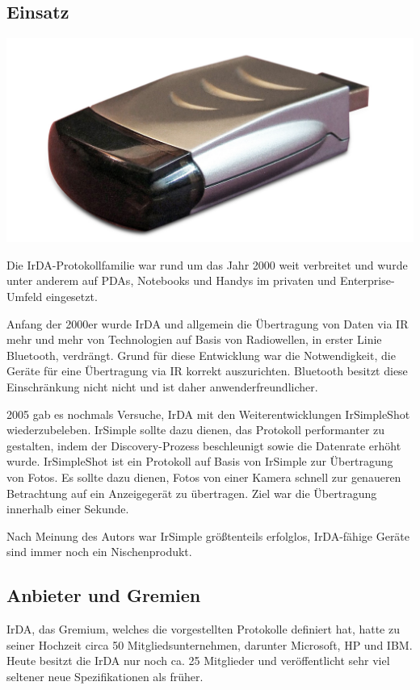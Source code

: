 \begin{multicols}{3}

\subsection*{Einsatz}
\begin{Figure}
\includegraphics[width=\linewidth]{Kapitel/IrDA/Grafiken/irda_usb.jpg}
\label{fig:irda.modem}
\end{Figure}
Die IrDA-Protokollfamilie war rund um das Jahr 2000 weit verbreitet und wurde unter anderem auf PDAs, Notebooks und Handys im privaten und Enterprise-Umfeld eingesetzt.

Anfang der 2000er wurde IrDA und allgemein die Übertragung von Daten via IR mehr und mehr von Technologien auf Basis von Radiowellen, in erster Linie Bluetooth, verdrängt. Grund für diese Entwicklung war die Notwendigkeit, die Geräte für eine Übertragung via IR korrekt auszurichten. Bluetooth besitzt diese Einschränkung nicht nicht und ist daher anwenderfreundlicher. 

2005 gab es nochmals Versuche, IrDA mit den Weiterentwicklungen IrSimpleShot wiederzubeleben. IrSimple sollte dazu dienen, das Protokoll performanter zu gestalten, indem der Discovery-Prozess beschleunigt sowie die Datenrate erhöht wurde. IrSimpleShot ist ein Protokoll auf Basis von IrSimple zur Übertragung von Fotos. Es sollte dazu dienen, Fotos von einer Kamera schnell zur genaueren Betrachtung auf ein Anzeigegerät zu übertragen. Ziel war die Übertragung innerhalb einer Sekunde.

Nach Meinung des Autors war IrSimple größtenteils erfolglos, IrDA-fähige Geräte sind immer noch ein Nischenprodukt. 

\subsection*{Anbieter und Gremien}
IrDA, das Gremium, welches die vorgestellten Protokolle definiert hat, hatte zu seiner Hochzeit circa 50 Mitgliedsunternehmen, darunter Microsoft, HP und IBM. Heute besitzt die IrDA nur noch ca. 25 Mitglieder und veröffentlicht sehr viel seltener neue Spezifikationen als früher.


\end{multicols}
